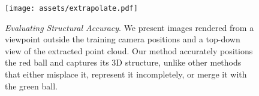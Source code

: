 \begin{figure}[!t]
    \centering
    \texttt{[image: assets/extrapolate.pdf]}
    \vspace{-2em}
    \caption{\textit{Evaluating Structural Accuracy}. 
    We present images rendered from a viewpoint outside the training camera positions and a top-down view of the extracted point cloud. 
    Our method accurately positions the red ball and captures its 3D structure, unlike other methods that either misplace it, represent it incompletely, or merge it with the green ball.
    }
    \label{fig:extrapolate}
    \vspace{-4mm}
\end{figure}
